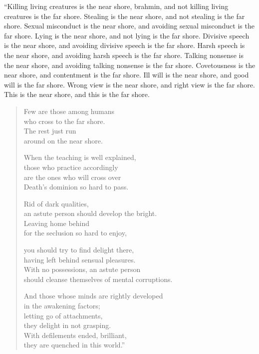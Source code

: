 \documentclass[12pt,openany]{book}%
\begin{document}
“Killing living creatures is the near shore, brahmin, and not killing living creatures is the far shore. Stealing is the near shore, and not stealing is the far shore. Sexual misconduct is the near shore, and avoiding sexual misconduct is the far shore. Lying is the near shore, and not lying is the far shore. Divisive speech is the near shore, and avoiding divisive speech is the far shore. Harsh speech is the near shore, and avoiding harsh speech is the far shore. Talking nonsense is the near shore, and avoiding talking nonsense is the far shore. Covetousness is the near shore, and contentment is the far shore. Ill will is the near shore, and good will is the far shore. Wrong view is the near shore, and right view is the far shore. This is the near shore, and this is the far shore. 

\begin{verse}%
Few are those among humans \\
who cross to the far shore. \\
The rest just run \\
around on the near shore. 

When the teaching is well explained, \\
those who practice accordingly \\
are the ones who will cross over \\
Death’s dominion so hard to pass. 

Rid of dark qualities, \\
an astute person should develop the bright. \\
Leaving home behind \\
for the seclusion so hard to enjoy, 

you should try to find delight there, \\
having left behind sensual pleasures. \\
With no possessions, an astute person \\
should cleanse themselves of mental corruptions. 

And those whose minds are rightly developed \\
in the awakening factors; \\
letting go of attachments, \\
they delight in not grasping. \\
With defilements ended, brilliant, \\
they are quenched in this world.” 

%
\end{verse}
\end{document}
